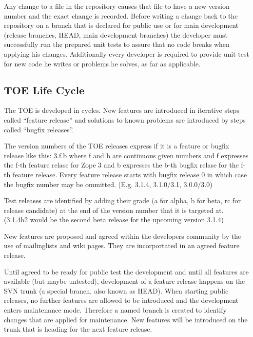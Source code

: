 \documentclass[10pt,a4paper,english]{article}
\begin{document}
Any change to a file in the repository causes that file to have a new version
number and the exact change is recorded. Before writing a change back to the
repository on a branch that is declared for public use or for main development
(release branches, HEAD, main development branches) the developer must
successfully run the prepared unit tests to assure that no code breaks when
applying his changes. Additionally every developer is required to provide unit
test for new code he writes or problems he solves, as far as applicable.



\hypertarget{toe-life-cycle}{}
\subsection*{TOE Life Cycle}

The TOE is developed in cycles. New features are introduced in iterative steps
called ``feature release'' and solutions to known problems are introduced by
steps called ``bugfix releases''.

The version numbers of the TOE releases express if it is a feature or bugfix
release like this: 3.f.b where f and b are continuous given numbers and f
expresses the f-th feature relase for Zope 3 and b expresses the b-th bugfix
relase for the f-th feature release. Every feature release starts with bugfix
release 0 in which case the bugfix number may be ommitted. (E.g. 3.1.4,
3.1.0/3.1, 3.0.0/3.0)

Test releases are identified by adding their grade (a for alpha, b for beta, rc
for release candidate) at the end of the version number that it is targeted at.
(3.1.4b2 would be the second beta release for the upcoming version 3.1.4)

New features are proposed and agreed within the developers community by the use
of mailinglists and wiki pages. They are incorportated in an agreed feature
release.

Until agreed to be ready for public test the development and until all
features are available (but maybe untested), development of a feature release
happens on the SVN trunk (a special branch, also known as HEAD). When starting
public releases, no further features are allowed to be introduced and the
development enters maintenance mode. Therefore a named branch is created to
identify changes that are applied for maintenance.  New features will be
introduced on the trunk that is heading for the next feature release.
\end{document}

